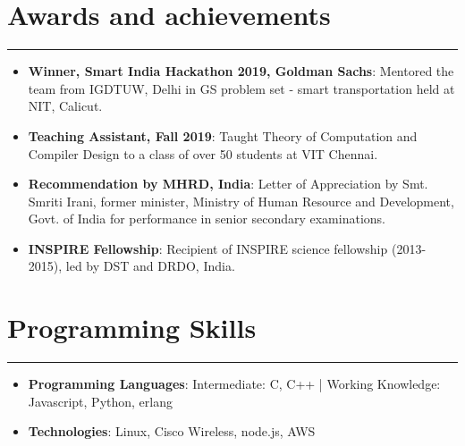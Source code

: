 \documentclass[a4paper,6pt]{article}
\begin{document}
\vspace{-9px}
\section*{Awards and achievements}
\vspace{-8px}
\hrule
\vspace{8px}
\begin{itemize}
	\item \textbf{Winner, Smart India Hackathon 2019, Goldman Sachs}: \small Mentored the team from IGDTUW, Delhi in GS problem set - smart transportation held at NIT, Calicut.
\normalsize
\vspace{2px}
	\item \textbf{Teaching Assistant, Fall 2019}: \small Taught Theory of Computation and Compiler Design to a class of over 50 students at VIT Chennai. 
\normalsize
\vspace{2px}
    \item \textbf{Recommendation by MHRD, India}: \small Letter of Appreciation by Smt. Smriti Irani, former minister, Ministry of Human Resource and Development, Govt. of India for performance in senior secondary examinations.
\normalsize
\vspace{2px}
	\item \textbf{INSPIRE Fellowship}: \small Recipient of INSPIRE science fellowship (2013-2015), led by DST and DRDO, India.
\normalsize
\end{itemize}

\vspace{-9px}
\section*{Programming Skills}
\vspace{-8px}
\hrule
\vspace{8px}
\begin{itemize}
	\item \textbf{Programming Languages}: \small Intermediate: C, C++ | Working Knowledge: Javascript, Python, erlang
\normalsize
\vspace{2px}
	\item \textbf{Technologies}: \small Linux, Cisco Wireless, node.js, AWS 
\normalsize
\end{itemize}
\end{document}
